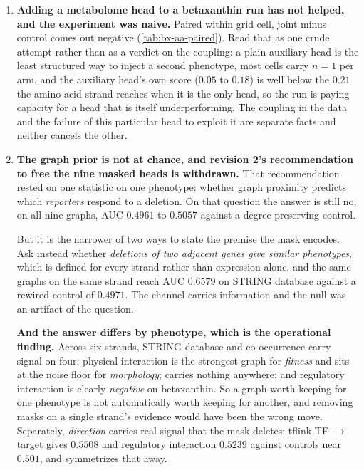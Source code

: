 \begin{enumerate}
\item \textbf{Adding a metabolome head to a betaxanthin run has not helped, and the
  experiment was naive.} Paired within grid cell, joint minus control comes out negative
  (\cref{tab:bx-aa-paired}). Read that as one crude attempt rather than as a verdict on the
  coupling: a plain auxiliary head is the least structured way to inject a second
  phenotype, most cells carry $n = 1$ per arm, and the auxiliary head's own score
  ($0.05$ to $0.18$) is well below the $0.21$ the amino-acid strand reaches when it is the
  only head, so the run is paying capacity for a head that is itself underperforming. The
  coupling in the data and the failure of this particular head to exploit it are separate
  facts and neither cancels the other.

\item \textbf{The graph prior is not at chance, and revision 2's recommendation to free the
  nine masked heads is withdrawn.} That recommendation rested on one statistic on one
  phenotype: whether graph proximity predicts which \emph{reporters} respond to a deletion.
  On that question the answer is still no, on all nine graphs, AUC $0.4961$ to $0.5057$
  against a degree-preserving control.

  But it is the narrower of two ways to state the premise the mask encodes. Ask instead
  whether \emph{deletions of two adjacent genes give similar phenotypes}, which is defined
  for every strand rather than expression alone, and the same graphs on the same strand reach
  AUC $\mathbf{0.6579}$ on STRING database against a rewired control of $0.4971$. The channel
  carries information and the null was an artifact of the question.

  \textbf{And the answer differs by phenotype, which is the operational finding.} Across six
  strands, STRING database and co-occurrence carry signal on four; physical interaction is
  the strongest graph for \emph{fitness} and sits at the noise floor for \emph{morphology};
   carries nothing anywhere; and regulatory interaction is clearly \emph{negative}
  on betaxanthin. So a graph worth keeping for one phenotype is not automatically worth
  keeping for another, and removing masks on a single strand's evidence would have been the
  wrong move. Separately, \emph{direction} carries real signal that the mask deletes: tflink
  TF $\to$ target gives $0.5508$ and regulatory interaction $0.5239$ against controls near
  $0.501$, and  symmetrizes that away.


\end{enumerate}
